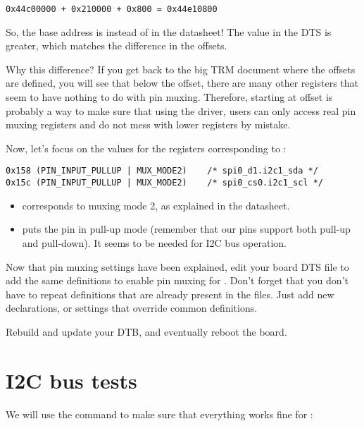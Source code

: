 \begin{verbatim}
0x44c00000 + 0x210000 + 0x800 = 0x44e10800
\end{verbatim}

So, the base address is  instead of  in
the datasheet! The value in the DTS is  greater, which
matches the difference in the offsets.

Why this difference? If you get back to the big TRM document where
the offsets are defined, you will see that below the 
offset, there are many other registers that seem to have nothing to do with
pin muxing. Therefore, starting at offset  is probably
a way to make sure that using the  driver, users
can only access real pin muxing registers and do not mess with lower
registers by mistake.

Now, let's focus on the values for the registers corresponding
to :

\begin{verbatim}
0x158 (PIN_INPUT_PULLUP | MUX_MODE2)    /* spi0_d1.i2c1_sda */
0x15c (PIN_INPUT_PULLUP | MUX_MODE2)    /* spi0_cs0.i2c1_scl */
\end{verbatim}

\begin{itemize}
\item {} corresponds to muxing mode 2, as explained in the
      datasheet.
\item {} puts the pin in pull-up mode (remember
      that our pins support both pull-up and pull-down). It seems to
      be needed for I2C bus operation.
\end{itemize}

Now that pin muxing settings have been explained, edit your board
DTS file to add the same definitions to enable pin muxing for .
Don't forget that you don't have to repeat definitions that are
already present in the  files. Just add new declarations, or
settings that override common definitions.

Rebuild and update your DTB, and eventually reboot the board.

\section{I2C bus tests}

We will use the  command to make sure that
everything works fine for :

